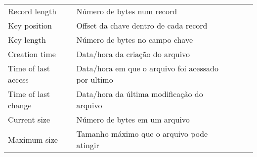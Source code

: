 \documentclass[10pt]{article}
\begin{document}
\begin{itemize}
\begin{table}[!ht]
\begin{tabular}{lllll}
        Record length           & Número de bytes num record                               &  &  &  \\
        Key position            & Offset da chave dentro de cada record                    &  &  &  \\
        Key length              & Número de bytes no campo chave                           &  &  &  \\
        Creation time           & Data/hora da criação do arquivo                          &  &  &  \\
        Time of last access     & Data/hora em que o arquivo foi acessado por ultimo       &  &  &  \\
        Time of last change     & Data/hora da última modificação do arquivo               &  &  &  \\
        Current size            & Número de bytes em um arquivo                            &  &  &  \\
        Maximum size            & Tamanho máximo que o arquivo pode atingir                &  &  &  \\
        \end{tabular}
    \end{table}
    \

\end{itemize}
\end{document}
